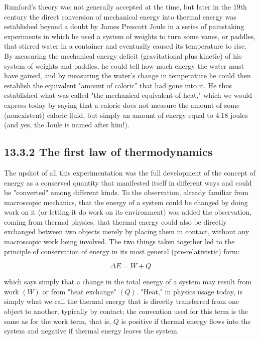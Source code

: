 \documentclass[10pt]{article}
\begin{document}
Rumford's theory was not generally accepted at the time, but later in the 19th century the direct conversion of mechanical energy into thermal energy was established beyond a doubt by James Prescott Joule in a series of painstaking experiments in which he used a system of weights to turn some vanes, or paddles, that stirred water in a container and eventually caused its temperature to rise. By measuring the mechanical energy deficit (gravitational plus kinetic) of his system of weights and paddles, he could tell how much energy the water must have gained, and by measuring the water's change in temperature he could then establish the equivalent "amount of caloric" that had gone into it. He thus established what was called "the mechanical equivalent of heat," which we would express today by saying that a calorie does not measure the amount of some (nonexistent) caloric fluid, but simply an amount of energy equal to 4.18 joules (and yes, the Joule is named after him!).

\subsection*{13.3.2 The first law of thermodynamics}
The upshot of all this experimentation was the full development of the concept of energy as a conserved quantity that manifested itself in different ways and could be "converted" among different kinds. To the observation, already familiar from macroscopic mechanics, that the energy of a system could be changed by doing work on it (or letting it do work on its environment) was added the observation, coming from thermal physics, that thermal energy could also be directly exchanged between two objects merely by placing them in contact, without any macroscopic work being involved. The two things taken together led to the principle of conservation of energy in its most general (pre-relativistic) form:


\begin{equation*}
\Delta E=W+Q \tag{13.8}
\end{equation*}


which says simply that a change in the total energy of a system may result from work $(W)$ or from "heat exchange" $(Q)$. "Heat," in physics usage today, is simply what we call the thermal energy that is directly transferred from one object to another, typically by contact; the convention used for this term is the same as for the work term, that is, $Q$ is positive if thermal energy flows into the system and negative if thermal energy leaves the system.
\end{document}
